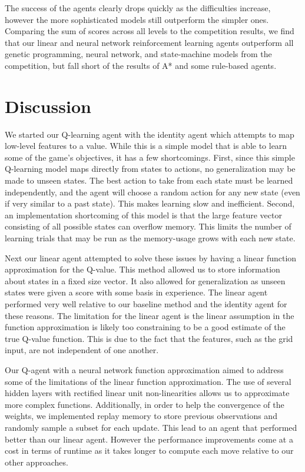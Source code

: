\documentclass[12pt]{article}
\begin{document}
The success of the agents clearly drops quickly as the difficulties increase, however the more sophisticated models still outperform the simpler ones. Comparing the sum of scores across all levels to the competition results, we find that our linear and neural network reinforcement learning agents outperform all genetic programming, neural network, and state-machine models from the competition, but fall short of the results of A* and some rule-based agents.

\section{Discussion}

We started our Q-learning agent with the identity agent which attempts to map low-level features to a value. While this is a simple model that is able to learn some of the game's objectives, it has a few shortcomings. First, since this simple Q-learning model maps directly from states to actions, no generalization may be made to unseen states. The best action to take from each state must be learned independently, and the agent will choose a random action for any new state (even if very similar to a past state). This makes learning slow and inefficient. Second, an implementation shortcoming of this model is that the large feature vector consisting of all possible states can overflow memory. This limits the number of learning trials that may be run as the memory-usage grows with each new state.

Next our linear agent attempted to solve these issues by having a linear function approximation for the Q-value. This method allowed us to store information about states in a fixed size vector. It also allowed for generalization as unseen states were given a score with some basis in experience. The linear agent performed very well relative to our baseline method and the identity agent for these reasons. The limitation for the linear agent is the linear assumption in the function approximation is likely too constraining to be a good estimate of the true Q-value function. This is due to the fact that the features, such as the grid input, are not independent of one another.

Our Q-agent with a neural network function approximation aimed to address some of the limitations of the linear function approximation. The use of several hidden layers with rectified linear unit non-linearities allows us to approximate more complex functions. Additionally, in order to help the convergence of the weights, we implemented replay memory to store previous observations and randomly sample a subset for each update. This lead to an agent that performed better than our linear agent. However the performance improvements come at a cost in terms of runtime as it takes  longer to compute each move relative to our other approaches.
\end{document}
